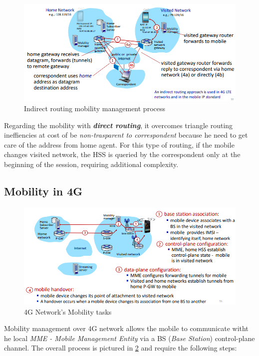 \documentclass[10pt,a4paper]{report}
\theoremstyle{definition}
\begin{document}
\begin{figure}[h]
	\centering\includegraphics[scale=0.50]{images/Pasted image 20230322114625.png}	\caption{Indirect routing mobility management process}
	\label{indirect-registration-process}
\end{figure}


Regarding the mobility with \textit{\textbf{direct routing}}, it overcomes triangle routing ineffiencies at cost of be \textit{non-trasparent to correspondent} because he need to get care of the address from home agent. For this type of routing, if the mobile changes visited network, the HSS is queried by the correspondent only at the beginning of the session, requiring additional complexity.
\subsection{Mobility in 4G}\label{sec:mobility-in-4g}
\begin{figure}[h]
	\centering\includegraphics[scale=0.50]{images/Pasted image 20230322120159.png}
	\caption{4G Network's Mobility tasks}
\label{4g-mobility-process}
\end{figure}


Mobility management over 4G network allows the mobile to communicate witht he local \textit{MME - Mobile Management Entity} via a BS (\textit{Base Station}) control-plane channel. The overall process is pictured in \ref{4g-mobility-process} and require the following steps:
\end{document}
